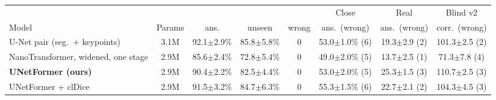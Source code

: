 \begin{tabular}{@{}lccccccc@{}}
\toprule
 & & \multicolumn{3}{c}{\bench{}} & Close & Real & Blind v2 \\
Model & Params & ans. & unseen & wrong & ans.\ (wrong) & ans.\ (wrong) & corr.\ (wrong) \\
\midrule
U-Net pair (seg.\ + keypoints) & 3.1M & 92.1$\pm$2.9\% & 85.8$\pm$5.8\% & 0 & 53.0$\pm$1.0\% (6) & 19.3$\pm$2.9 (2) & 101.3$\pm$2.5 (2) \\
NanoTransformer, widened, one stage & 2.9M & 85.6$\pm$2.4\% & 72.8$\pm$5.4\% & 0 & 49.0$\pm$2.0\% (5) & 13.7$\pm$2.5 (1) & 71.3$\pm$7.8 (4) \\
\textbf{UNetFormer (ours)} & 2.9M & 90.4$\pm$2.2\% & 82.5$\pm$4.4\% & 0 & 53.0$\pm$2.0\% (5) & 25.3$\pm$1.5 (3) & 110.7$\pm$2.5 (3) \\
UNetFormer + clDice & 2.9M & 91.5$\pm$3.2\% & 84.7$\pm$6.3\% & 0 & 55.3$\pm$1.5\% (6) & 22.7$\pm$2.1 (2) & 104.3$\pm$4.5 (3) \\
\bottomrule
\end{tabular}
